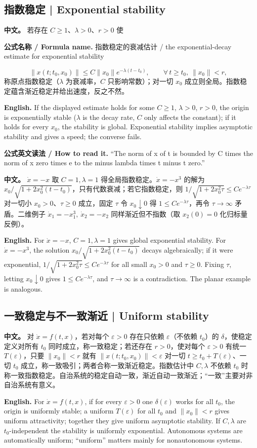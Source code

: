\documentclass[UTF8,11pt,a4paper]{ctexart}
\newcommand{\READ}[1]{\par\noindent\textbf{公式英文读法 / How to read it.} #1\par}
\newcommand{\FORMULA}[2]{\par\noindent\textbf{公式名称 / Formula name.} #1 / #2\par}
\newcommand{\APS}[2]{\par\noindent\textbf{中文。} #1\par\noindent\textbf{English.} #2\par}
\newcommand{\norm}[1]{\lVert #1\rVert}\newcommand{\abs}[1]{\lvert #1\rvert}
\begin{document}
\subsection{指数稳定 | Exponential stability}
\APS{若存在 $C\ge1$、$\lambda>0$、$r>0$ 使
\FORMULA{指数稳定的衰减估计}{the exponential-decay estimate for exponential stability}
\[
\norm{x(t;t_0,x_0)}\le C\norm{x_0}e^{-\lambda(t-t_0)},\qquad \forall\,t\ge t_0,\ \norm{x_0}<r,
\]
称原点指数稳定（$\lambda$ 为衰减率，$C$ 只影响常数）；对一切 $x_0$ 成立则全局。指数稳定蕴含渐近稳定并给出速度，反之不然。}{If the displayed estimate holds for some $C\ge1$, $\lambda>0$, $r>0$, the origin is exponentially stable ($\lambda$ is the decay rate, $C$ only affects the constant); if it holds for every $x_0$, the stability is global. Exponential stability implies asymptotic stability and gives a speed; the converse fails.}
\READ{“The norm of x of t is bounded by C times the norm of x zero times e to the minus lambda times t minus t zero.”}

\APS{$\dot x=-x$ 取 $C=1,\lambda=1$ 得全局指数稳定。$\dot x=-x^3$ 的解为 $x_0/\sqrt{1+2x_0^2(t-t_0)}$，只有代数衰减；若它指数稳定，则 $1/\sqrt{1+2x_0^2\tau}\le Ce^{-\lambda\tau}$ 对一切小 $x_0>0$、$\tau\ge0$ 成立，固定 $\tau$ 令 $x_0\downarrow0$ 得 $1\le Ce^{-\lambda\tau}$，再令 $\tau\to\infty$ 矛盾。二维例子 $\dot x_1=-x_1^3,\ \dot x_2=-x_2$ 同样渐近但不指数（取 $x_2(0)=0$ 化归标量反例）。}{For $\dot x=-x$, $C=1,\lambda=1$ gives global exponential stability. For $\dot x=-x^3$, the solution $x_0/\sqrt{1+2x_0^2(t-t_0)}$ decays algebraically; if it were exponential, $1/\sqrt{1+2x_0^2\tau}\le Ce^{-\lambda\tau}$ for all small $x_0>0$ and $\tau\ge0$. Fixing $\tau$, letting $x_0\downarrow0$ gives $1\le Ce^{-\lambda\tau}$, and $\tau\to\infty$ is a contradiction. The planar example is analogous.}

\subsection{一致稳定与不一致渐近 | Uniform stability}
\APS{对 $\dot x=f(t,x)$，若对每个 $\varepsilon>0$ 存在只依赖 $\varepsilon$（不依赖 $t_0$）的 $\delta$，使稳定定义对所有 $t_0$ 同时成立，称一致稳定；若还存在 $r>0$，使对每个 $\varepsilon>0$ 有统一 $T(\varepsilon)$，只要 $\norm{x_0}<r$ 就有 $\norm{x(t;t_0,x_0)}<\varepsilon$ 对一切 $t\ge t_0+T(\varepsilon)$、一切 $t_0$ 成立，称一致吸引；两者合称一致渐近稳定。指数估计中 $C,\lambda$ 不依赖 $t_0$ 时称一致指数稳定。自治系统的稳定自动一致，渐近自动一致渐近；“一致”主要对非自治系统有意义。}{For $\dot x=f(t,x)$, if for every $\varepsilon>0$ one $\delta(\varepsilon)$ works for all $t_0$, the origin is uniformly stable; a uniform $T(\varepsilon)$ for all $t_0$ and $\norm{x_0}<r$ gives uniform attractivity; together they give uniform asymptotic stability. If $C,\lambda$ are $t_0$-independent the stability is uniformly exponential. Autonomous systems are automatically uniform; “uniform” matters mainly for nonautonomous systems.}
\end{document}

